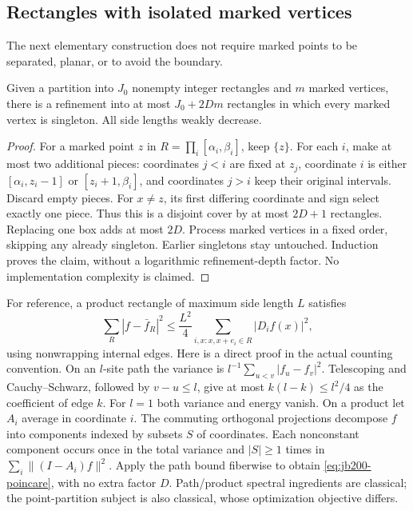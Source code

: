 \subsection{Rectangles with isolated marked vertices}
The next elementary construction does not require marked points to be
separated, planar, or to avoid the boundary.
\begin{lemma}\label{lem:jb200-isolate}
Given a partition into $J_0$ nonempty integer rectangles and $m$ marked
vertices, there is a refinement into at most $J_0+2Dm$ rectangles in which
every marked vertex is singleton. All side lengths weakly decrease.
\end{lemma}
\begin{proof}
For a marked point $z$ in $R=\prod_i[\alpha_i,\beta_i]$, keep $\{z\}$.
For each $i$, make at most two additional pieces: coordinates $j<i$ are
fixed at $z_j$, coordinate $i$ is either $[\alpha_i,z_i-1]$ or
$[z_i+1,\beta_i]$, and coordinates $j>i$ keep their original intervals.
Discard empty pieces. For $x\ne z$, its first differing coordinate and
sign select exactly one piece. Thus this is a disjoint cover by at most
$2D+1$ rectangles. Replacing one box adds at most $2D$. Process marked
vertices in a fixed order, skipping any already singleton. Earlier
singletons stay untouched. Induction proves the claim, without a
logarithmic refinement-depth factor. No implementation complexity is claimed.
\end{proof}

For reference, a product rectangle of maximum side length $L$ satisfies
\begin{equation}\label{eq:jb200-poincare}
 \sum_R|f-\bar f_R|^2\le\frac{L^2}{4}
 \sum_{i,x:x,x+e_i\in R}|D_if(x)|^2,
\end{equation}
using nonwrapping internal edges. Here is a direct proof in the actual
counting convention. On an $l$-site path the variance is
$l^{-1}\sum_{u<v}|f_u-f_v|^2$. Telescoping and Cauchy--Schwarz, followed
by $v-u\le l$, give at most $k(l-k)\le l^2/4$ as the coefficient of edge
$k$. For $l=1$ both variance and energy vanish. On a product let $A_i$
average in coordinate $i$. The commuting orthogonal projections decompose
$f$ into components indexed by subsets $S$ of coordinates. Each nonconstant
component occurs once in the total variance and $|S|\ge1$ times in
$\sum_i\|(I-A_i)f\|^2$. Apply the path bound fiberwise to obtain
\eqref{eq:jb200-poincare}, with no extra factor $D$. Path/product spectral
ingredients are classical\cite{jb:saito}; the point-partition subject is
also classical\cite{jb:gonzalez}, whose optimization objective differs.

